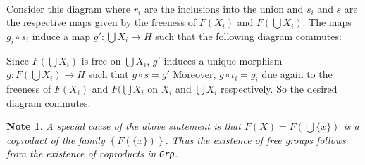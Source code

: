 \documentclass[twoside]{report}
\newcommand{\cat}[1]{\texttt{#1}}
\newcounter{Lecture}
\theoremstyle{myts}
\newcounter{c}[Lecture]
\newtheorem*{nte}{Note}
\newcounter{ex}
\newenvironment{prf}{
  \noindent\begin{mdframed}[style=prf]}{\end{mdframed} \vspace{1em}
}
\begin{document}
\begin{prf}
  \begin{center}
    \
  \end{center}
  Consider this diagram where $r_i$ are the inclusions into the union and $s_i$ and $s$ are the respective maps given by the freeness of \(F(X_i)\) and \(F(\bigcup X_i)\). The maps \(g_i\circ s_i\) induce a map \(g': \bigcup X_i \to H \) such that the following diagram commutes:
  \begin{center}
  \end{center}
  Since \(F(\bigcup X_i)\) is free on \(\bigcup X_i\), $g'$ induces a unique morphism \(g: F(\bigcup X_i) \to H\) such that \(g\circ s = g'\) Moreover, \(g\circ \iota_i = g_i\) due again to the freeness of \(F(X_i)\) and \(F(\bigcup X_i\) on \(X_i\) and \(\bigcup X_i\) respectively. So the desired diagram commutes:
  \begin{center}
  \end{center}
\end{prf}

\begin{nte}
  A special cacse of the above statement is that \(F(X)=F\left(\bigcup \{x\}\right)\) is a coproduct of the family \( \left\{ F(\{x\})\right\}\). Thus the existence of free groups follows from the existence of coproducts in \cat{Grp}.
\end{nte}
\end{document}

